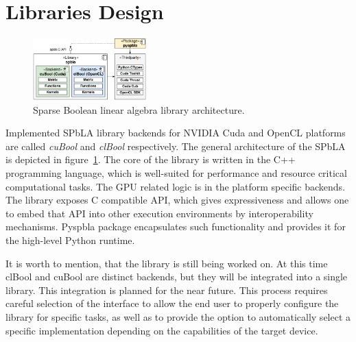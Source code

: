 \section{Libraries Design}



\begin{figure}[t]
    \centering
    \includegraphics[width=0.39\textwidth]{generic_architecture.png}
    \caption{Sparse Boolean linear algebra library architecture.}
    \label{fig:generic_architecture}
\end{figure}

Implemented SPbLA library backends for NVIDIA Cuda and OpenCL platforms are called \textit{cuBool} and  \textit{clBool} respectively.
The general architecture of the SPbLA is depicted in figure~\ref{fig:generic_architecture}.
The core of the library is written in the C++ programming language, which is well-suited for performance and resource critical computational tasks.
The GPU related logic is in the platform specific backends.
The library exposes C compatible API, which gives expressiveness and allows one to embed that API into other execution environments by interoperability mechanisms.
Pyspbla package encapsulates such functionality and provides it for the high-level Python runtime.

It is worth to mention, that the library is still being worked on. At this time clBool and cuBool are distinct backends, but they will be integrated into a single library.
This integration is planned for the near future.
This process requires careful selection of the interface to allow the end user to properly configure the library for specific tasks, as well as to provide the option to automatically select a specific implementation depending on the capabilities of the target device. 

